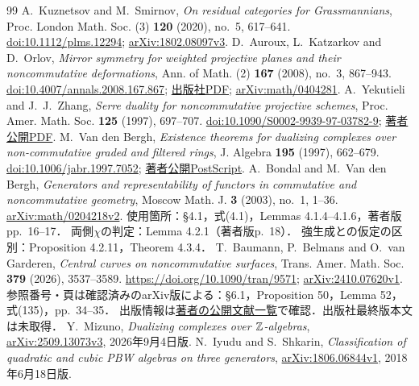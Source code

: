 \documentclass[11pt,a4paper]{ltjsarticle}
\begin{document}
\begin{thebibliography}{99}
 A.~Kuznetsov and M.~Smirnov,
\emph{On residual categories for Grassmannians},
Proc. London Math. Soc. (3) \textbf{120} (2020), no.~5, 617--641.
\href{https://doi.org/10.1112/plms.12294}{doi:10.1112/plms.12294};
\href{https://arxiv.org/abs/1802.08097v3}{arXiv:1802.08097v3}.
 D.~Auroux, L.~Katzarkov and D.~Orlov,
\emph{Mirror symmetry for weighted projective planes and their noncommutative deformations},
Ann. of Math. (2) \textbf{167} (2008), no.~3, 867--943.
\href{https://doi.org/10.4007/annals.2008.167.867}{doi:10.4007/annals.2008.167.867};
\href{https://annals.math.princeton.edu/wp-content/uploads/annals-v167-n3-p04.pdf}{出版社PDF};
\href{https://arxiv.org/abs/math/0404281}{arXiv:math/0404281}.
 A.~Yekutieli and J.~J.~Zhang,
\emph{Serre duality for noncommutative projective schemes},
Proc. Amer. Math. Soc. \textbf{125} (1997), 697--707.
\href{https://doi.org/10.1090/S0002-9939-97-03782-9}{doi:10.1090/S0002-9939-97-03782-9};
\href{https://www.math.bgu.ac.il/~amyekut/publications/nc-serre/paper.pdf}{著者公開PDF}.
 M.~Van den Bergh,
\emph{Existence theorems for dualizing complexes over non-commutative graded and filtered rings},
J. Algebra \textbf{195} (1997), 662--679.
\href{https://doi.org/10.1006/jabr.1997.7052}{doi:10.1006/jabr.1997.7052};
\href{https://cantate.be/site/dualcompl.ps}{著者公開PostScript}.
 A.~Bondal and M.~Van den Bergh,
\emph{Generators and representability of functors in commutative and noncommutative geometry},
Moscow Math. J. \textbf{3} (2003), no.~1, 1--36.
\href{https://arxiv.org/abs/math/0204218v2}{arXiv:math/0204218v2}.
使用箇所：\S4.1，式(4.1)，Lemmas 4.1.4--4.1.6，著者版pp.~16--17．
両側$\chi$の判定：Lemma 4.2.1（著者版p.~18）．
強生成との仮定の区別：Proposition 4.2.11，Theorem 4.3.4．
 T.~Baumann, P.~Belmans and O.~van Garderen,
\emph{Central curves on noncommutative surfaces},
Trans. Amer. Math. Soc. \textbf{379} (2026), 3537--3589.
\url{https://doi.org/10.1090/tran/9571};
\href{https://arxiv.org/abs/2410.07620v1}{arXiv:2410.07620v1}.
参照番号・頁は確認済みのarXiv版による：\S6.1，Proposition 50，Lemma 52，式(135)，pp.~34--35．
出版情報は\href{https://pbelmans.ncag.info/writing/}{著者の公開文献一覧}で確認．出版社最終版本文は未取得．
 Y.~Mizuno,
\emph{Dualizing complexes over $\mathbb Z$-algebras},
\href{https://arxiv.org/abs/2509.13073v3}{arXiv:2509.13073v3}, 2026年9月4日版.
 N.~Iyudu and S.~Shkarin,
\emph{Classification of quadratic and cubic PBW algebras on three generators},
\href{https://arxiv.org/abs/1806.06844v1}{arXiv:1806.06844v1}, 2018年6月18日版.

\end{thebibliography}
\end{document}
